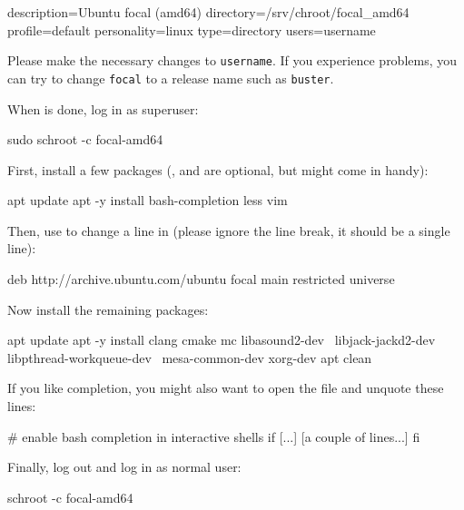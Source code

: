 \begin{Verbatim64}
  description=Ubuntu focal (amd64)
  directory=/srv/chroot/focal_amd64
  profile=default
  personality=linux
  type=directory
  users=username
\end{Verbatim64}

Please make the necessary changes to \texttt{username}.  If you
experience problems, you can try to change \texttt{focal} to a
release name such as \texttt{buster}.

When  is done, log in as superuser:

\begin{Verbatim64}
  sudo schroot -c focal-amd64
\end{Verbatim64}

First, install a few packages (,  and 
are optional, but might come in handy):

\begin{VerbatimBoth}
  apt update
  apt -y install bash-completion less vim
\end{VerbatimBoth}

Then, use  to change a line in 
(please ignore the line break, it should be a single line):

\begin{VerbatimBoth}
  deb http://archive.ubuntu.com/ubuntu focal
  main restricted universe
\end{VerbatimBoth}

Now install the remaining packages:

\begin{VerbatimBoth}
  apt update
  apt -y install clang cmake mc libasound2-dev \
    libjack-jackd2-dev libpthread-workqueue-dev \
    mesa-common-dev xorg-dev
  apt clean
\end{VerbatimBoth}

If you like  completion, you might also want to open the
file  and unquote these lines:

\begin{VerbatimBoth}
  # enable bash completion in interactive shells
  if [...]
    [a couple of lines...]
  fi
\end{VerbatimBoth}

Finally, log out and log in as normal user:

\begin{Verbatim64}
  schroot -c focal-amd64
\end{Verbatim64}

